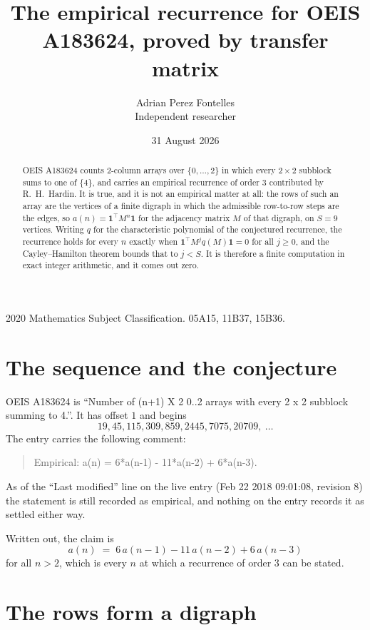 \documentclass[11pt,a4paper]{article}
\title{The empirical recurrence for OEIS A183624, proved by transfer matrix}
\author{Adrian Perez Fontelles\\ \small Independent researcher}
\date{31 August 2026}
\theoremstyle{plain}
\theoremstyle{definition}
\begin{document}
\maketitle

\begin{abstract}
OEIS A183624 counts $2$-column arrays over $\{0,\dots,2\}$ in which every
$2\times2$ subblock sums to one of $\{4\}$, and carries an empirical
recurrence of order $3$ contributed by R.~H.~Hardin. It is true, and it is not an
empirical matter at all: the rows of such an array are the vertices of a finite digraph in
which the admissible row-to-row steps are the edges, so $a(n)=\mathbf{1}^{\!\top}M^{n}
\mathbf{1}$ for the adjacency matrix $M$ of that digraph, on $S=9$ vertices. Writing
$q$ for the characteristic polynomial of the conjectured recurrence, the recurrence holds
for every $n$ exactly when $\mathbf{1}^{\!\top}M^{j}q(M)\mathbf{1}=0$ for all
$j\ge0$, and the Cayley--Hamilton theorem bounds that to $j<S$. It is therefore a finite
computation in exact integer arithmetic, and it comes out zero.
\end{abstract}

\noindent\small 2020 Mathematics Subject Classification. 05A15, 11B37, 15B36.\normalsize

\section{The sequence and the conjecture}

OEIS A183624 is ``Number of (n+1) X 2 0..2 arrays with every 2 x 2 subblock summing to 4.''. It has offset $1$
and begins
\[
19, 45, 115, 309, 859, 2445, 7075, 20709,\ \dots
\]
The entry carries the following comment:
\begin{quote}\small
Empirical: a(n) = 6*a(n-1) - 11*a(n-2) + 6*a(n-3).
\end{quote}
As of the ``Last modified'' line on the live entry (Feb 22 2018 09:01:08, revision 8) the statement is
still recorded as empirical, and nothing on the entry records it as settled either way.

Written out, the claim is
\begin{equation}\label{eq:conj}
a(n)\;=\;6\,a(n-1) - 11\,a(n-2) + 6\,a(n-3)
\end{equation}
for all $n>2$, which is every $n$ at which a recurrence of order $3$ can be
stated.

\section{The rows form a digraph}
\end{document}

